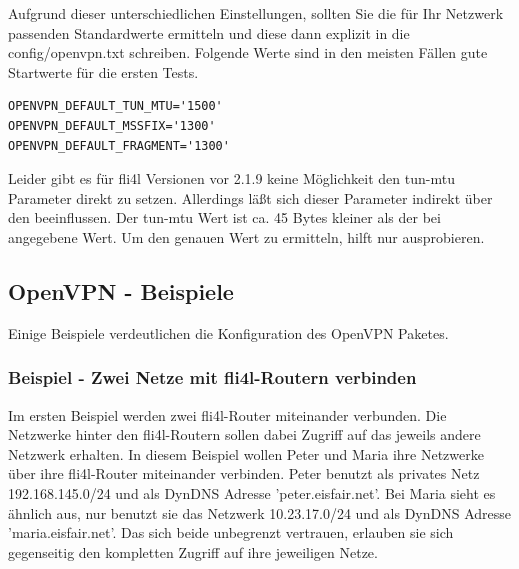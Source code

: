 Aufgrund dieser unterschiedlichen Einstellungen, sollten Sie die für
Ihr Netzwerk passenden Standardwerte ermitteln und diese dann explizit
in die config/openvpn.txt schreiben. Folgende Werte sind in den
meisten Fällen gute Startwerte für die ersten Tests.

\begin{example}
\begin{verbatim}
OPENVPN_DEFAULT_TUN_MTU='1500'
OPENVPN_DEFAULT_MSSFIX='1300'
OPENVPN_DEFAULT_FRAGMENT='1300'
\end{verbatim}
\end{example}

Leider gibt es für fli4l Versionen vor 2.1.9 keine Möglichkeit den
\glqq{}tun-mtu\grqq{} Parameter direkt zu setzen. Allerdings läßt sich
dieser Parameter indirekt über den 
beeinflussen. Der tun-mtu Wert ist ca. 45 Bytes kleiner als der bei
 angegebene Wert. Um den genauen Wert zu
ermitteln, hilft nur ausprobieren.

\subsection{OpenVPN - Beispiele}

Einige Beispiele verdeutlichen die Konfiguration des OpenVPN Paketes.

\subsubsection{Beispiel - Zwei Netze mit fli4l-Routern verbinden}

Im ersten Beispiel werden zwei fli4l-Router miteinander verbunden.
Die Netzwerke hinter den fli4l-Routern sollen dabei Zugriff auf das
jeweils andere Netzwerk erhalten. In diesem Beispiel wollen Peter und
Maria ihre Netzwerke über ihre fli4l-Router miteinander verbinden.
Peter benutzt als privates Netz 192.168.145.0/24 und als DynDNS
Adresse 'peter.eisfair.net'. Bei Maria sieht es ähnlich aus, nur
benutzt sie das Netzwerk 10.23.17.0/24 und als DynDNS Adresse
'maria.eisfair.net'. Das sich beide unbegrenzt vertrauen, erlauben sie
sich gegenseitig den kompletten Zugriff auf ihre jeweiligen Netze.

